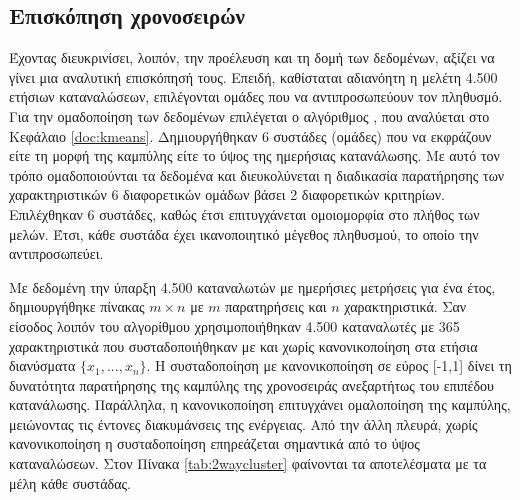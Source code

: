 \subsection{Επισκόπηση χρονοσειρών}
Έχοντας διευκρινίσει, λοιπόν, την προέλευση και τη δομή των δεδομένων, αξίζει να γίνει μια αναλυτική επισκόπησή τους. Επειδή, καθίσταται αδιανόητη η μελέτη 4.500 ετήσιων καταναλώσεων, επιλέγονται ομάδες που να αντιπροσωπεύουν τον πληθυσμό. Για την ομαδοποίηση των δεδομένων επιλέγεται ο αλγόριθμος , που αναλύεται στο Κεφάλαιο \ref{doc:kmeans}. Δημιουργήθηκαν 6 συστάδες (ομάδες) που να εκφράζουν είτε τη μορφή της καμπύλης είτε το ύψος της ημερήσιας κατανάλωσης. Με αυτό τον τρόπο ομαδοποιούνται τα δεδομένα και διευκολύνεται η διαδικασία παρατήρησης των χαρακτηριστικών 6 διαφορετικών ομάδων βάσει 2 διαφορετικών κριτηρίων. Επιλέχθηκαν 6 συστάδες, καθώς έτσι επιτυγχάνεται ομοιομορφία στο πλήθος των μελών. Έτσι, κάθε συστάδα έχει ικανοποιητικό μέγεθος πληθυσμού, το οποίο την αντιπροσωπεύει.\par
Με δεδομένη την ύπαρξη 4.500 καταναλωτών με ημερήσιες μετρήσεις για ένα έτος, δημιουργήθηκε πίνακας $m \times n$ με $m$ παρατηρήσεις και $n$ χαρακτηριστικά. Σαν είσοδος λοιπόν του αλγορίθμου  χρησιμοποιήθηκαν 4.500 καταναλωτές με 365 χαρακτηριστικά που συσταδοποιήθηκαν με και χωρίς κανονικοποίηση στα ετήσια διανύσματα $\{x_{1}, ..., x_{n}\}$. Η συσταδοποίηση με κανονικοποίηση σε εύρος [-1,1] δίνει τη δυνατότητα παρατήρησης της καμπύλης της χρονοσειράς ανεξαρτήτως του επιπέδου κατανάλωσης. Παράλληλα, η κανονικοποίηση επιτυγχάνει ομαλοποίηση της καμπύλης, μειώνοντας τις έντονες διακυμάνσεις της ενέργειας.  Από την άλλη πλευρά, χωρίς κανονικοποίηση η συσταδοποίηση επηρεάζεται σημαντικά από το ύψος καταναλώσεων. Στον Πίνακα \ref{tab:2waycluster} φαίνονται τα αποτελέσματα με τα μέλη κάθε συστάδας.\par
